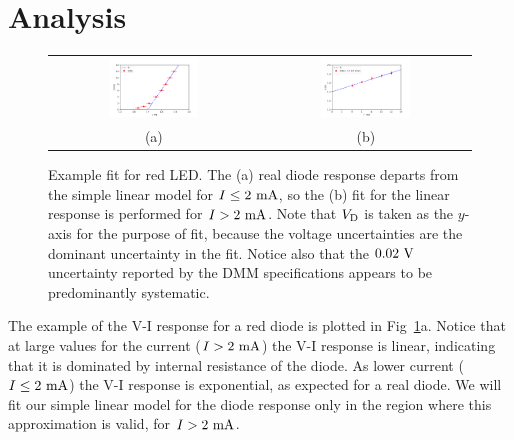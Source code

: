 \section{Analysis}

\begin{figure}[htbp]
\begin{center}
\begin{tabular}{cc}
\includegraphics[width=0.45\textwidth]{figs/labs/planck/fit_diode.pdf} &
\includegraphics[width=0.45\textwidth]{figs/labs/planck/fit_vi.pdf} \\
(a) & (b) \\
\end{tabular}
\end{center}
\caption{Example fit for red LED.  The (a) real diode response
  departs from the simple linear model for $I \leq 2~\rm mA$, so the
  (b) fit for the linear response is performed for $I > 2~\rm mA$.
  Note that $V_{\rm D}$ is taken as the $y$-axis for the purpose of fit,
  because the voltage uncertainties are the dominant uncertainty in
  the fit.  Notice also that the $0.02~\rm V$ uncertainty reported by
  the DMM specifications appears to be predominantly systematic.}
\label{fig:redfit}
\end{figure}

The example of the V-I response for a red diode is
plotted in Fig~\ref{fig:redfit}a.  Notice that at large values for the
current ($I > 2~\rm mA$) the V-I response is linear, indicating that it
is dominated by internal resistance of the diode.  As lower current
($I \leq 2~\rm mA$) the V-I response is exponential, as expected for a
real diode.  We will fit our simple linear model for the diode
response only in the region where this approximation is valid, for
$I>2~\rm mA$. 

